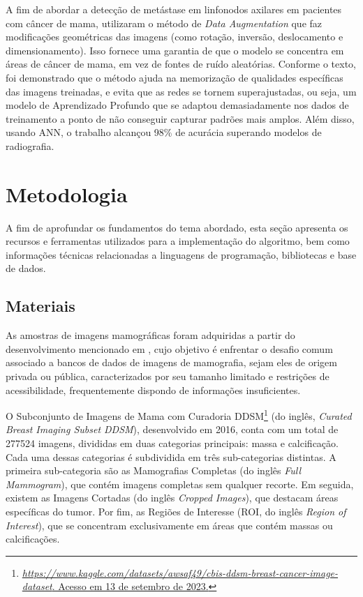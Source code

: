 A fim de abordar a detecção de metástase em linfonodos axilares em pacientes com câncer de mama,  utilizaram o método de \textit{Data Augmentation} que faz modificações geométricas das imagens (como rotação, inversão, deslocamento e dimensionamento). Isso fornece uma garantia de que o modelo se concentra em áreas de câncer de mama, em vez de fontes de ruído aleatórias. Conforme o texto, foi demonstrado que o método ajuda na memorização de qualidades específicas das imagens treinadas, e evita que as redes se tornem superajustadas, ou seja, um modelo de Aprendizado Profundo que se adaptou demasiadamente nos dados de treinamento a ponto de não conseguir capturar padrões mais amplos. Além disso, usando ANN, o trabalho alcançou 98\% de acurácia superando modelos de radiografia.




\section{\esp Metodologia} \label{metodologia}
A fim de aprofundar os fundamentos do tema abordado, esta seção apresenta os recursos e ferramentas utilizados para a implementação do algoritmo, bem como informações técnicas relacionadas a linguagens de programação, bibliotecas e base de dados.



\subsection{\esp Materiais} \label{materiais}

As amostras de imagens mamográficas foram adquiridas a partir do desenvolvimento mencionado em , cujo objetivo é enfrentar o desafio comum associado a bancos de dados de imagens de mamografia, sejam eles de origem privada ou pública, caracterizados por seu tamanho limitado e restrições de acessibilidade, frequentemente dispondo de informações insuficientes.

O Subconjunto de Imagens de Mama com Curadoria DDSM\footnote{\href{https://www.kaggle.com/datasets/awsaf49/cbis-ddsm-breast-cancer-image-dataset}{\textit{https://www.kaggle.com/datasets/awsaf49/cbis-ddsm-breast-cancer-image-dataset}. Acesso em 13 de setembro de 2023.}} (do inglês, \textit{Curated Breast Imaging Subset DDSM}), desenvolvido em 2016, conta com um total de 277524 imagens, divididas em duas categorias principais: massa e calcificação. Cada uma dessas categorias é subdividida em três sub-categorias distintas. A primeira sub-categoria são as Mamografias Completas (do inglês \textit{Full Mammogram}), que contém imagens completas sem qualquer recorte. Em seguida, existem as Imagens Cortadas (do inglês \textit{Cropped Images}), que destacam áreas específicas do tumor. Por fim, as Regiões de Interesse (ROI, do inglês \textit{Region of Interest}), que se concentram exclusivamente em áreas que contém massas ou calcificações.

